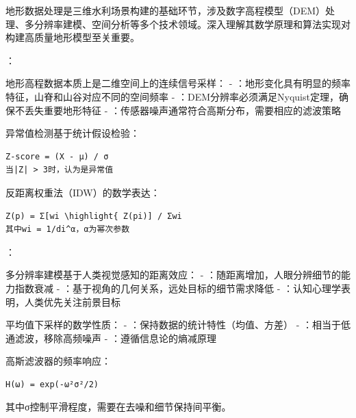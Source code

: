 
地形数据处理是三维水利场景构建的基础环节，涉及数字高程模型（DEM）处理、多分辨率建模、空间分析等多个技术领域。深入理解其数学原理和算法实现对构建高质量地形模型至关重要。

：


地形高程数据本质上是二维空间上的连续信号采样： - ：地形变化具有明显的频率特征，山脊和山谷对应不同的空间频率 - ：DEM分辨率必须满足Nyquist定理，确保不丢失重要地形特征 - ：传感器噪声通常符合高斯分布，需要相应的滤波策略


异常值检测基于统计假设检验：

\begin{lstlisting}
Z-score = (X - μ) / σ
当|Z| > 3时，认为是异常值
\end{lstlisting}


反距离权重法（IDW）的数学表达：

\begin{lstlisting}
Z(p) = Σ[wi \highlight{ Z(pi)] / Σwi
其中wi = 1/di^α，α为幂次参数
\end{lstlisting}

：


多分辨率建模基于人类视觉感知的距离效应： - ：随距离增加，人眼分辨细节的能力指数衰减 - ：基于视角的几何关系，远处目标的细节需求降低 - ：认知心理学表明，人类优先关注前景目标


平均值下采样的数学性质： - ：保持数据的统计特性（均值、方差） - ：相当于低通滤波，移除高频噪声 - ：遵循信息论的熵减原理


高斯滤波器的频率响应：

\begin{lstlisting}
H(ω) = exp(-ω²σ²/2)
\end{lstlisting}

其中σ控制平滑程度，需要在去噪和细节保持间平衡。

